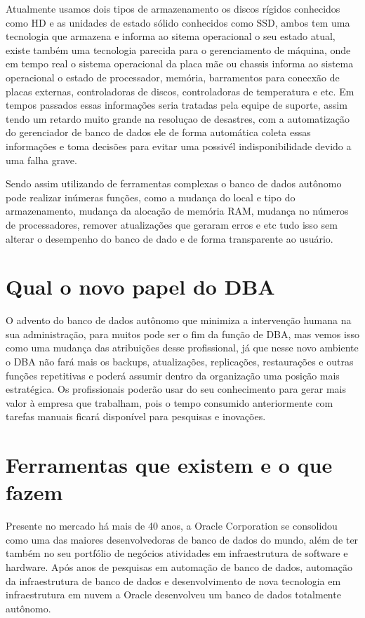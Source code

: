 \begin{alineas}
	Atualmente usamos dois tipos de armazenamento os discos rígidos conhecidos como HD e as unidades de estado sólido conhecidos como SSD, ambos tem uma tecnologia que armazena e informa ao sitema operacional o seu estado atual, existe também uma tecnologia parecida para o gerenciamento de máquina, onde em tempo real o sistema operacional da placa mãe ou chassis informa ao sistema operacional o estado de processador, memória, barramentos para conecxão de placas externas, controladoras de discos, controladoras de temperatura e etc. Em tempos passados essas informações seria tratadas pela equipe de suporte, assim tendo um retardo muito grande na resoluçao de desastres, com a automatização do gerenciador de banco de dados ele de forma automática coleta essas informações e toma decisões para evitar uma possivél indisponibilidade devido a uma falha grave.
	
	Sendo assim utilizando de ferramentas complexas o banco de dados autônomo pode realizar inúmeras funções, como a mudança do local e tipo do armazenamento, mudança da alocação de memória RAM, mudança no números de processadores, remover atualizações que geraram erros e etc tudo isso sem alterar o desempenho do banco de dado e de forma transparente ao usuário.   
	  
\end{alineas}

\section{Qual o novo papel do DBA}

O advento do banco de dados autônomo que minimiza a intervenção humana na sua administração, para muitos pode ser o fim da função de DBA, mas vemos isso como uma mudança das atribuições desse profissional, já que nesse novo ambiente o DBA não fará mais os backups, atualizações, replicações, restaurações e outras funções repetitivas e poderá assumir dentro da organização uma posição mais estratégica. Os profissionais poderão usar do seu conhecimento para gerar mais valor à empresa que trabalham, pois o tempo consumido anteriormente com tarefas manuais ficará disponível para pesquisas e inovações.


\section{Ferramentas que existem e o que fazem}

Presente no mercado há mais de 40 anos, a Oracle Corporation se consolidou como uma das maiores desenvolvedoras de banco de dados do mundo, além de ter também no seu portfólio de negócios atividades em infraestrutura de software e hardware.  Após anos de pesquisas em automação de banco de dados, automação da infraestrutura de banco de dados e desenvolvimento de nova tecnologia em infraestrutura em nuvem a Oracle desenvolveu um banco de dados totalmente autônomo.

